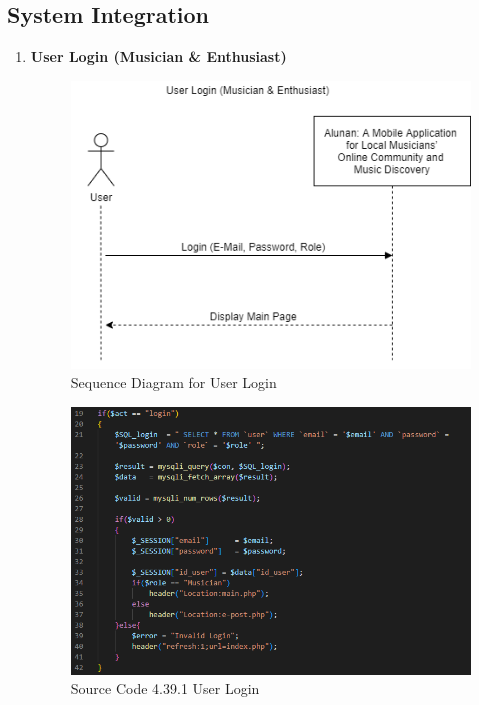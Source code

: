 \subsection{System Integration}
\begin{enumerate}[1.]
    \item \textbf{User Login (Musician \& Enthusiast)}
    \begin{figure}[h]
        \centering
        \includegraphics[width=0.8\linewidth]{mainmatter/images/systemint/siuserlogin.png}
        \caption{Sequence Diagram for User Login}
        \label{fig:myfig75}
    \end{figure}
    \begin{figure}[h]\ContinuedFloat
        \centering
        \includegraphics[width=1.0\linewidth]{mainmatter/images/systemint/codelogin.png}
        \caption*{Source Code 4.39.1 User Login}
        \label{fig:myfig75a}
    \end{figure}
    \clearpage


\end{enumerate}

